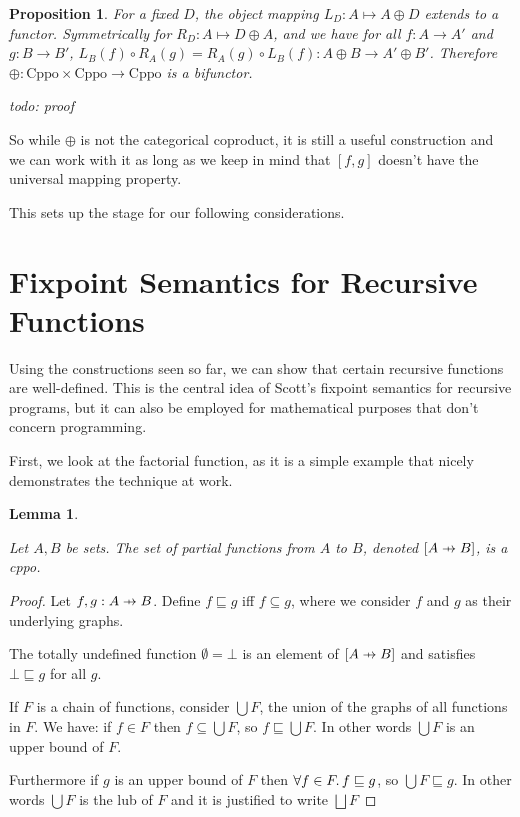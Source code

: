 \documentclass[a4paper]{article}
\newcommand{\below}{\sqsubseteq}
\newcommand{\arr}{\rightarrow}
\newcommand{\todo}[1]{\smallskip \noindent \emph{todo: #1} \smallskip}
\newcommand{\lub}{\bigsqcup}
\newcommand{\pfun}{\mathrel{\ooalign{\hfil$\mapstochar\mkern5mu$\hfil\cr$\to$\cr}}}
\newtheorem{proposition}[definition]{Proposition}
\newtheorem{lemma}[definition]{Lemma}
\begin{document}
\begin{proposition}

For a fixed $D$, the object mapping $L_D : A \mapsto A \oplus D$ extends to a
functor.  Symmetrically for $R_D : A \mapsto D \oplus A$, and we have for all $f
: A \arr A'$ and $g : B \arr B'$, $L_B(f) \circ R_A(g) = R_A(g) \circ L_B(f) : A
\oplus B \arr A' \oplus B'$.  Therefore $\oplus : \text{Cppo} \times \text{Cppo}
\arr \text{Cppo}$ is a bifunctor.

\end{proposition}

\todo{proof}

So while $\oplus$ is not the categorical coproduct, it is still a useful
construction and we can work with it as long as we keep in mind that $[f,g]$
doesn't have the universal mapping property.

This sets up the stage for our following considerations.

\section{Fixpoint Semantics for Recursive Functions}

Using the constructions seen so far, we can show that certain recursive
functions are well-defined. This is the central idea of Scott's fixpoint
semantics for recursive programs, but it can also be employed for mathematical
purposes that don't concern programming.

First, we look at the factorial function, as it is a simple example that nicely
demonstrates the technique at work.

\begin{lemma} \label{lemPartialFunctionSpaceCppo}

Let $A, B$ be sets. The set of partial functions from $A$ to $B$, denoted
$[A \pfun B]$, is a cppo.

\end{lemma}

\begin{proof}

Let $f, g : A \pfun B$. Define $f \below g$ iff $f \subseteq g$, where we
consider $f$ and $g$ as their underlying graphs.

The totally undefined function $\emptyset = \bot$ is an element of $[A \pfun B]$
and satisfies $\bot \below g$ for all $g$.

If $F$ is a chain of functions, consider $\bigcup F$, the union of the graphs of
all functions in $F$. We have: if $f \in F$ then $f \subseteq \bigcup F$, so $f
\below \bigcup F$.  In other words $\bigcup F$ is an upper bound of $F$.

Furthermore if $g$ is an upper bound of $F$ then $\forall f \in F \ldotp f
\below g$, so $\bigcup F \below g$. In other words $\bigcup F$ is the lub of $F$
and it is justified to write $\lub F$

\end{proof}
\end{document}
